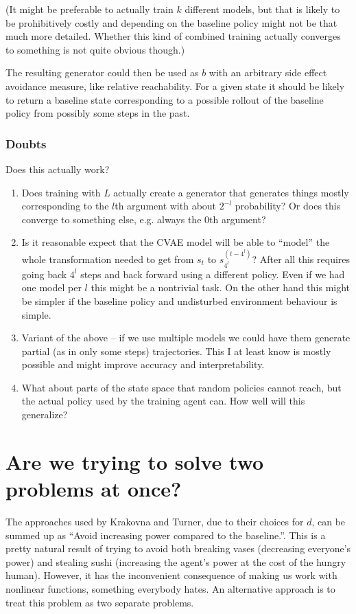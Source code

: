 \documentclass{article}
\newcommand{\deviationFromBaseline}{d}
\newcommand{\baseline}{b}
\begin{document}
		(It might be preferable to actually train $k$ different models, but that is likely to
		be prohibitively costly and depending on the baseline policy might not be that much more detailed.
	 Whether this kind of combined training actually converges to something is not quite obvious though.)

		The resulting generator could then be used as $\baseline$ with an arbitrary side effect avoidance
		measure, like relative reachability. For a given state it should be likely to return
		a baseline state corresponding to a possible rollout of the baseline policy from possibly some
		steps in the past.

		\subsubsection{Doubts}
		 Does this actually work?
			\begin{enumerate}
				\item Does training with $L$ actually create a generator that
					generates things mostly corresponding to the $l$th argument with about $2^{-l}$
					probability? Or does this converge to something else, e.g. always the $0$th argument?
				\item Is it reasonable expect that the CVAE model will be able to ``model'' the whole
					transformation needed to get from $s_t$ to $s^{\left( t-4^l \right)}_{4^l}$?
					After all this requires going back $4^l$ steps and back forward using a different policy.
					Even if we had one model per $l$ this might be a nontrivial task. On the other hand this might
					be simpler if the baseline policy and undisturbed environment behaviour is simple.
				\item Variant of the above -- if we use multiple models we could have them generate
					partial (as in only some steps) trajectories. This I at least know is mostly possible
					and might improve accuracy and interpretability.
				\item What about parts of the state space that random policies cannot reach, but the
					actual policy used by the training agent can. How well will this generalize?
			\end{enumerate}
\section{Are we trying to solve two problems at once?}
	The approaches used by Krakovna and Turner, due to their choices for $\deviationFromBaseline$,
	can be summed up as ``Avoid increasing power compared to the baseline.''. This is a pretty natural
	result of trying to avoid both breaking vases (decreasing everyone's power) and stealing sushi
	(increasing the agent's power at the cost of the hungry human). However, it has the inconvenient
	consequence of making us work with nonlinear functions, something everybody hates.
	An alternative approach is to treat this problem as two separate problems.
\end{document}
